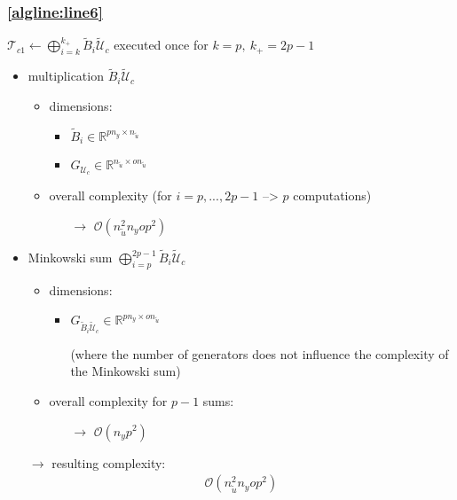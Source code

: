 \documentclass{article}
\begin{document}
\subsubsection{\cref{algline:line6}} 
$\mathcal{T}_{c1} \gets \bigoplus_{i=k}^{k_+}\tilde{B}_i \tilde{\mathcal{U}}_c$  
executed once for $k=p,~k_+=2p-1$
\begin{itemize}
    \item multiplication $\tilde{B}_{i} \tilde{\mathcal{U}}_c$
    \begin{itemize}
        \item dimensions:
        \begin{itemize}
            \item $\tilde{B}_{i} \in \mathbb{R}^{pn_y \times n_{\tilde{u}}}$
            \item $G_{\mathcal{U}_c} \in \mathbb{R}^{n_{\tilde{u}} \times o n_{\tilde{u}}}$
        \end{itemize}
        \item overall complexity (for $i=p,...,2p-1$ --> $p$ computations)
        \begin{itemize}
            \item[$\rightarrow$] $\mathcal{O}(n_{\tilde{u}}^2 n_y o p^2)$
        \end{itemize}
    \end{itemize}
    \item Minkowski sum $\bigoplus_{i=p}^{2p-1}\tilde{B}_i \tilde{\mathcal{U}}_c$
    \begin{itemize}
        \item dimensions:
        \begin{itemize}
            \item $G_{\tilde{B}_{i} \tilde{\mathcal{U}}_c} \in \mathbb{R}^{pn_y \times on_{\tilde{u}}}$ 
            \item[] (where the number of generators does not influence the complexity of the Minkowski sum)
        \end{itemize}
        \item overall complexity for $p-1$ sums:
        \begin{itemize}
            \item[$\rightarrow$] $\mathcal{O}(n_y p^2)$
        \end{itemize}
    \end{itemize}    
    \item[$\rightarrow$] resulting complexity: \begin{align*}
        \mathcal{O}(n_{\tilde{u}}^2 n_y o p^2)
    \end{align*}
\end{itemize}
 
\end{document}
